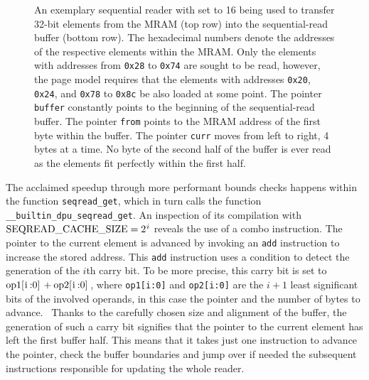 \begin{figure}

	\caption{
		An exemplary sequential reader with \seqreadcachesize{} set to 16 being used to transfer 32-bit elements from the \ac{MRAM} (top row) into the sequential-read buffer (bottom row).
		The hexadecimal numbers denote the addresses of the respective elements within the \ac{MRAM}.
		Only the elements with addresses from \lstinline|0x28| to \lstinline|0x74| are sought to be read, however, the page model requires that the elements with addresses \lstinline|0x20|, \lstinline|0x24|, and \lstinline|0x78| to \lstinline|0x8c| be also loaded at some point.
		The pointer \lstinline|buffer| constantly points to the beginning of the sequential-read buffer.
		The pointer \lstinline|from| points to the \ac{MRAM} address of the first byte within the buffer.
		The pointer \lstinline|curr| moves from left to right, 4 bytes at a time.
		No byte of the second half of the buffer is ever read as the elements fit perfectly within the first half.
	}
	\label{fig:merge:reader}
\end{figure}

The acclaimed speedup through more performant bounds checks happens within the function \lstinline|seqread_get|, which in turn calls the function \lstinline|__builtin_dpu_seqread_get|.
An inspection of its compilation with \(\seqreadcachesize{} = \twotoi\) reveals the use of a combo instruction.
The pointer to the current element is advanced by invoking an \lstinline|add| instruction to increase the stored address.
This \lstinline|add| instruction uses a condition to detect the generation of the \(i\)th carry bit.
To be more precise, this carry bit is set to \(\text{\lstinline|op1[i:0]|} + \text{\lstinline|op2[i:0]|}\), where \lstinline|op1[i:0]| and \lstinline|op2[i:0]| are the \(i + 1\) least significant bits of the involved operands, in this case the pointer and the number of bytes to advance.~\cite[DPU Handbook -- Specific Conditions Common To Addition and Subtraction]{upmemSDK}
Thanks to the carefully chosen size and alignment of the buffer, the generation of such a carry bit signifies that the pointer to the current element has left the first buffer half.
This means that it takes just one instruction to advance the pointer, check the buffer boundaries and jump over \Dash if needed \Dash the subsequent instructions responsible for updating the whole reader.
